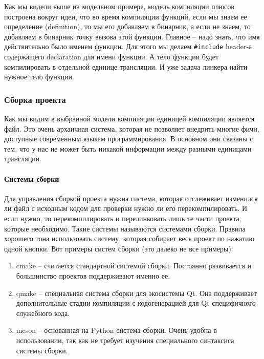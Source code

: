 Как мы видели выше на модельном примере, модель компиляции плюсов построена вокруг идеи, что во время компиляции функций, если мы знаем ее определение (definition), то мы его добавляем в бинарник, а если не знаем, то добавляем в бинарник точку вызова этой функции.
Главное -- надо знать, что имя действительно было именем функции.
Для этого мы делаем \verb"#include" header-а содержащего declaration для имени функции.
А тело функции будет компилировать в отдельной единице трансляции.
И уже задача линкера найти нужное тело функции.

\subsubsection{Сборка проекта}

Как мы видим в выбранной модели компиляции единицей компиляции является файл.
Это очень архаичная система, которая не позволяет внедрить многие фичи, доступные современным языкам программирования.
В основном они связаны с тем, что у нас не может быть никакой информации между разными единицами трансляции.

\paragraph{Системы сборки}

Для управления сборкой проекта нужна система, которая отслеживает изменился ли файл с исходным кодом для проверки нужно ли его перекомпилировать.
И если нужно, то перекомпилировать и перелинковать лишь те части проекта, которые необходимо.
Такие системы называются системами сборки.
Правила хорошего тона использовать систему, которая собирает весь проект по нажатию одной кнопки.
Вот примеры систем сборки (это далеко не все примеры):
\begin{enumerate}
\item cmake -- считается стандартной системой сборки.
Постоянно развивается и большинство проектов поддерживают именно ее.

\item qmake -- специальная система сборки для экосистемы Qt.
Она поддерживает дополнительные стадии компиляции с кодогенерацией для Qt специфичного служебного кода.

\item meson -- основанная на Python система сборки.
Очень удобна в использовании, так как не требует изучения специального синтаксиса системы сборки.
\end{enumerate}

